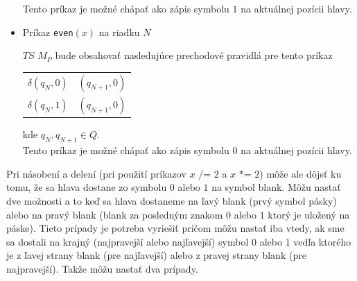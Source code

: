 \documentclass[11pt,a4paper]{article}
\begin{document}
\begin{itemize}
\begin{flushright}
\begin{minipage}{0.90\textwidth}
            Tento príkaz je možné chápať ako zápis symbolu $1$ na aktuálnej pozícii hlavy.
        \end{minipage}
        \end{flushright}
    \item Príkaz \texttt{even}$(x)$ na riadku $N$\\[-1.5em]
        \begin{flushright}
        \begin{minipage}{0.90\textwidth}
            $TS$ $M_P$ bude obsahovať nasledujúce prechodové pravidlá pre tento príkaz
            \begin{center}
            \begin{tabular}{r@{ $=$ }l}
                $\delta(q_{N}, 0)$ & $(q_{N+1}, 0)$\\
                $\delta(q_{N}, 1)$ & $(q_{N+1}, 0)$
            \end{tabular}
            \end{center}
            kde $q_{N}, q_{N+1} \in Q$.\\

            Tento príkaz je možné chápať ako zápis symbolu $0$ na aktuálnej pozícii hlavy.
        \end{minipage}
        \end{flushright}
\end{itemize}

Pri násobení a delení (pri použití príkazov $x \texttt{ /= } 2$ a $x \texttt{ *= } 2$) môže ale dôjsť ku tomu, že sa hlava dostane zo symbolu $0$ alebo $1$ na symbol blank. Môžu nastať dve možnosti a to keď sa hlava dostaneme na ľavý blank (prvý symbol pásky) alebo na pravý blank (blank za posledným znakom $0$ alebo $1$ ktorý je uložený na páske). Tieto prípady je potreba vyriešiť pričom môžu nastať iba vtedy, ak sme sa dostali na krajný (najpravejší alebo najľavejší) symbol $0$ alebo $1$ vedľa ktorého je z ľavej strany blank (pre najľavejší) alebo z pravej strany blank (pre najpravejší). Takže môžu nastať dva prípady.
\end{document}
